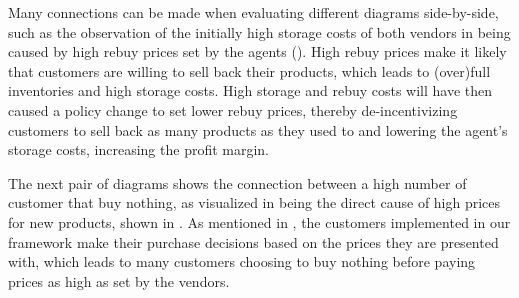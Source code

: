 Many connections can be made when evaluating different diagrams side-by-side, such as the observation of the initially high storage costs of both vendors in  being caused by high rebuy prices set by the agents (). High rebuy prices make it likely that customers are willing to sell back their products, which leads to (over)full inventories and high storage costs. High storage and rebuy costs will have then caused a policy change to set lower rebuy prices, thereby de-incentivizing customers to sell back as many products as they used to and lowering the agent's storage costs, increasing the profit margin.

The next pair of diagrams shows the connection between a high number of customer that buy nothing, as visualized in  being the direct cause of high prices for new products, shown in . As mentioned in , the customers implemented in our framework make their purchase decisions based on the prices they are presented with, which leads to many customers choosing to buy nothing before paying prices as high as set by the vendors.

